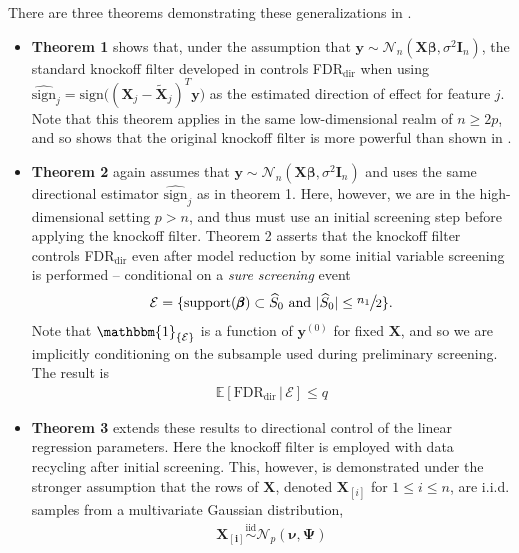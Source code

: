 \documentclass[]{scrartcl}
\newcommand{\1}[1]{\mathbbm{1}_{\left\{#1\right\}}}
\begin{document}
\noindent
There are three theorems demonstrating these generalizations in \cite{kohd}. 
\begin{itemize}
	\item\textbf{Theorem 1} shows that, under the assumption that $\mathbf{y} \sim \mathcal{N}_{n}(\mathbf{X}\pmb{\beta}, \sigma^{2}\mathbf{I}_{n})$, the standard knockoff filter developed in \cite{ko} controls FDR$_{\text{dir}}$ when using $\widehat{\text{sign}}_{j} = \text{sign}\big((\mathbf{X}_{j} - \widetilde{\mathbf{X}}_{j})^{T}\mathbf{y}\big)$ as the estimated direction of effect for feature $j$. Note that this theorem applies in the same low-dimensional realm of $n \geq 2p$, and so shows that the original knockoff filter is more powerful than shown in \cite{ko}.
	\item\textbf{Theorem 2} again assumes that $\mathbf{y} \sim \mathcal{N}_{n}(\mathbf{X}\pmb{\beta}, \sigma^{2}\mathbf{I}_{n})$ and uses the same directional estimator $\widehat{\text{sign}}_{j}$ as in theorem 1. Here, however, we are in the high-dimensional setting $p > n$, and thus must use an initial screening step before applying the knockoff filter. Theorem 2 asserts that the knockoff filter controls FDR$_{\text{dir}}$ even after model reduction by some initial variable screening is performed -- conditional on a \textit{sure screening} event
	\begin{align}
		\mathcal{E} = \{\text{support}(\pmb{\beta}) \subset \widehat{S}_{0}\ \text{and}\ |\widehat{S}_{0}| \leq  \mathlarger{\sfrac{n_{1}}{2}} \}.
	\end{align}
	Note that $\1{\mathcal{E}}$ is a function of $\mathbf{y}^{(0)}$ for fixed $\mathbf{X}$, and so we are implicitly conditioning on the subsample used during preliminary screening. The result is
	\begin{align}
		\mathbb{E}[\text{FDR}_{\text{dir}}\,|\,\mathcal{E}] \leq q
	\end{align}
	\item\textbf{Theorem 3} extends these results to directional control of the linear regression parameters. Here the knockoff filter is employed with data recycling after initial screening. This, however, is demonstrated under the stronger assumption that the rows of $\mathbf{\mathbf{X}}$, denoted $\mathbf{\mathbf{X}}_{[i]}$ for $1 \leq i \leq n$, are i.i.d. samples from a multivariate Gaussian distribution,
	\begin{align}\label{eq:xn}
	\mathbf{\mathbf{X}_{[i]}} \overset{\text{iid}}{\sim} \mathcal{N}_{p}(\pmb{\nu}, \pmb{\Psi})
	\end{align}

\end{itemize}
\end{document}
